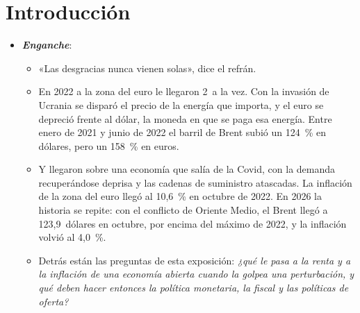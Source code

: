 \documentclass[11pt]{article}
\begin{document}
\tceetitulo

\section*{Introducción}

\begin{itemize}
\item \textbf{\emph{Enganche}}:
  \begin{itemize}
  \item «Las desgracias nunca vienen solas», dice el refrán.
  \item En 2022 a la zona del euro le llegaron 2~a la vez. Con la invasión de Ucrania se disparó el precio de la energía que importa, y el euro se depreció frente al dólar, la moneda en que se paga esa energía. Entre enero de 2021 y junio de 2022 el barril de Brent subió un 124~\% en dólares, pero un 158~\% en euros\nocite{EIA2026Brent,BCE2026EXR}.
  \item Y llegaron sobre una economía que salía de la Covid, con la demanda recuperándose deprisa y las cadenas de suministro atascadas. La inflación de la zona del euro llegó al 10,6~\% en octubre de 2022\nocite{Eurostat2026IAPC}. En 2026 la historia se repite: con el conflicto de Oriente Medio, el Brent llegó a 123,9~dólares en octubre, por encima del máximo de 2022, y la inflación volvió al 4,0~\%\nocite{EIA2026Brent,Eurostat2026IAPCoct}.
  \item Detrás están las preguntas de esta exposición: \emph{¿qué le pasa a la renta y a la inflación de una economía abierta cuando la golpea una perturbación, y qué deben hacer entonces la política monetaria, la fiscal y las políticas de oferta?}
  \end{itemize}


\end{itemize}
\end{document}
